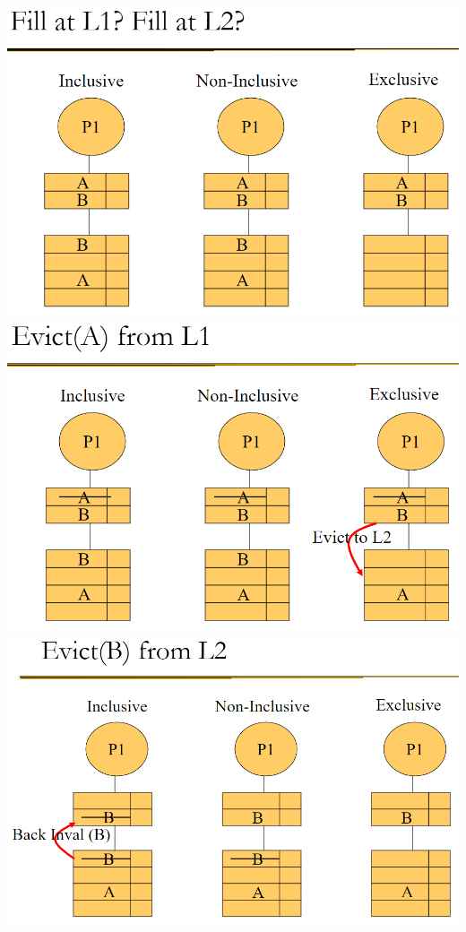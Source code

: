 \documentclass[12pt]{extarticle}
\begin{document}
\begin{center}
		\includegraphics[scale=0.5]{assets/inclusion-policy-ex4.png}
		\includegraphics[scale=0.5]{assets/inclusion-policy-ex5.png}
		\includegraphics[scale=0.5]{assets/inclusion-policy-ex6.png}
	\end{center}
\end{document}
